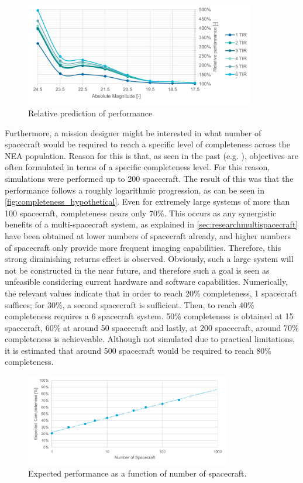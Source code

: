 \begin{figure}[htbp]
 \centering
 \includegraphics[width=0.9\textwidth]{img/performance_prediction_rel.pdf}
 \caption{Relative prediction of performance}
 \label{fig:performance_prediction_rel}
\end{figure}

Furthermore, a mission designer might be interested in what number of spacecraft would be required to reach a specific level of completeness across the NEA population. Reason for this is that, as seen in the past (e.g. \cite{2003NEOSDT}), objectives are often formulated in terms of a specific completeness level. For this reason, simulations were performed up to 200 spacecraft. The result of this was that the performance follows a roughly logarithmic progression, as can be seen in \autoref{fig:completeness_hypothetical}. Even for extremely large systems of more than 100 spacecraft, completeness nears only 70\%. This occurs as any synergistic benefits of a multi-spacecraft system, as explained in \autoref{sec:researchmultispacecraft} have been obtained at lower numbers of spacecraft already, and higher numbers of spacecraft only provide more frequent imaging capabilities. Therefore, this strong diminishing returns effect is observed. Obviously, such a large system will not be constructed in the near future, and therefore such a goal is seen as unfeasible considering current hardware and software capabilities. Numerically, the relevant values indicate that in order to reach 20\% completeness, 1 spacecraft suffices; for 30\%, a second spacecraft is sufficient. Then, to reach 40\% completeness requires a 6 spacecraft system. 50\% completeness is obtained at 15 spacecraft, 60\% at around 50 spacecraft and lastly, at 200 spacecraft, around 70\% completeness is achieveable. Although not simulated due to practical limitations, it is estimated that around 500 spacecraft would be required to reach 80\% completeness.

\begin{figure}[htbp]
 \centering
 \includegraphics[width=0.8\textwidth]{img/completeness_hypothetical.pdf}
 \caption{Expected performance as a function of number of spacecraft.}
 \label{fig:completeness_hypothetical}
\end{figure}


